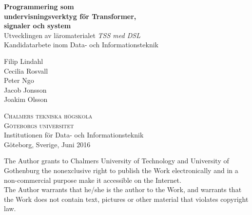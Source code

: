 
\begin{titlepage}

\addtolength{\voffset}{2cm}


\mbox{}
\vfill
\renewcommand{\familydefault}{\sfdefault} \normalfont %
\textbf{{\Huge Programmering som\\ undervisningsverktyg för Transformer,\\signaler och system\\[0.2cm]}}
{\Large Utvecklingen av läromaterialet \textit{TSS med DSL} }\\[0.5cm]
Kandidatarbete inom Data- och Informationsteknik \setlength{\parskip}{1cm}

\begin{flushleft}
  \Large
  Filip Lindahl\\
  Cecilia Rosvall\\
  Peter Ngo\\
  Jacob Jonsson\\
  Joakim Olsson\\
\end{flushleft}


\setlength{\parskip}{2.9cm}

{\small
\textsc{Chalmers tekniska högskola} \\
\textsc{Göteborgs universitet} \\
Institutionen för Data- och Informationsteknik \\
Göteborg, Sverige, Juni 2016}

\renewcommand{\familydefault}{\rmdefault} \normalfont %
\end{titlepage}

\newpage
\thispagestyle{plain}

The Author grants to Chalmers University of Technology and University
of Gothenburg the nonexclusive right to publish the Work
electronically and in a non-commercial purpose make it accessible on
the Internet. \\
The Author warrants that he/she is the author to the
Work, and warrants that the Work does not contain text, pictures or
other material that violates copyright law.

